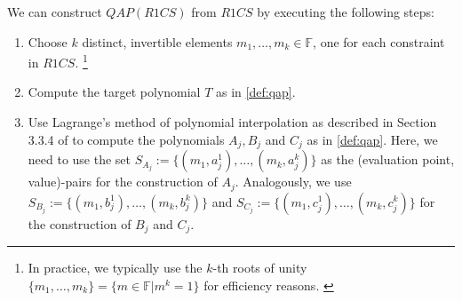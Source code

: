 We can construct $QAP(R1CS)$ from $R1CS$ by executing the following steps:
\begin{enumerate}
    \item Choose $k$ distinct, invertible elements $m_1,\dots, m_k\in\mathbb{F}$, one for each constraint in $R1CS$. \footnote{
        \label{footnote:qapRootsOfUnity}
        In practice, we typically use the $k$-th roots of unity $\{m_1,\dots, m_k\}=\{m\in\mathbb{F}| m^k=1\}$ for efficiency reasons. \cite{dunkelman_families_2022}
    }
    \item Compute the target polynomial $T$ as in \cref{def:qap}.
    \item Use Lagrange's method of polynomial interpolation as described in Section 3.3.4 of \cite{least_authority_moonmath_2024} to compute the polynomials $A_j, B_j$ and $C_j$ as in \cref{def:qap}.
    Here, we need to use the set $S_{A_j}:=\{(m_1,a_j^1),\dots, (m_k, a_j^k)\}$ as the (evaluation point, value)-pairs for the construction of $A_j$. 
    Analogously, we use $S_{B_j}:=\{(m_1,b_j^1),\dots, (m_k, b_j^k)\}$ and $S_{C_j}:=\{(m_1,c_j^1),\dots, (m_k, c_j^k)\}$ for the construction of $B_j$ and $C_j$.
\end{enumerate}

